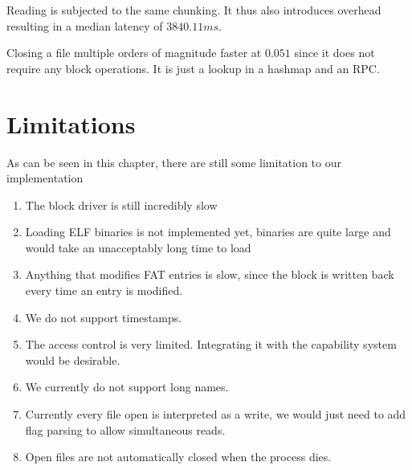 Reading is subjected to the same chunking. It thus also introduces overhead resulting in a median latency of $3840.11ms$.

Closing a file multiple orders of magnitude faster at $0.051$ since it does not require any block operations.
It is just a lookup in a hashmap and an RPC.


\section{Limitations}
As can be seen in this chapter, there are still some limitation to our implementation
\begin{enumerate}
    \item The block driver is still incredibly slow
    \item Loading ELF binaries is not implemented yet, binaries are quite large and would take an unacceptably  long time to load
    \item Anything that modifies FAT entries is slow, since the block is written back every time an entry is modified.
    \item We do not support timestamps.
    \item The access control is very limited. Integrating it with the capability system would be desirable.
    \item We currently do not support long names.
    \item Currently every file open is interpreted as a write, we would just need to add flag parsing to allow simultaneous reads.
    \item Open files are not automatically closed when the process dies.
\end{enumerate}
